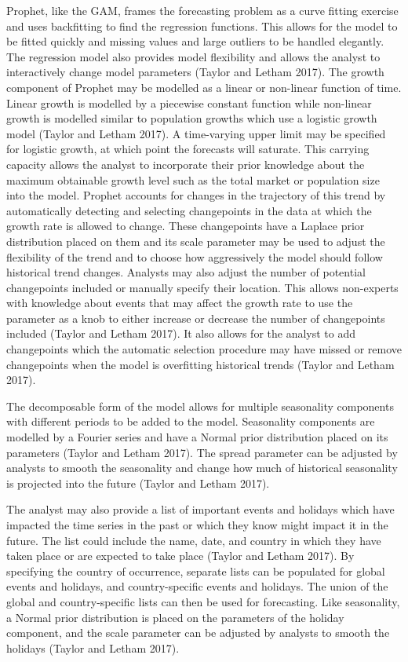 \documentclass[12pt,a4paper]{article}
\numberwithin{equation}{section}
\numberwithin{figure}{section}
\numberwithin{table}{section}
\begin{document}
Prophet, like the GAM, frames the forecasting problem as a curve fitting
exercise and uses backfitting to find the regression functions. This
allows for the model to be fitted quickly and missing values and large
outliers to be handled elegantly. The regression model also provides
model flexibility and allows the analyst to interactively change model
parameters (Taylor and Letham 2017). The growth component of Prophet may
be modelled as a linear or non-linear function of time. Linear growth is
modelled by a piecewise constant function while non-linear growth is
modelled similar to population growths which use a logistic growth model
(Taylor and Letham 2017). A time-varying upper limit may be specified
for logistic growth, at which point the forecasts will saturate. This
carrying capacity allows the analyst to incorporate their prior
knowledge about the maximum obtainable growth level such as the total
market or population size into the model. Prophet accounts for changes
in the trajectory of this trend by automatically detecting and selecting
changepoints in the data at which the growth rate is allowed to change.
These changepoints have a Laplace prior distribution placed on them and
its scale parameter may be used to adjust the flexibility of the trend
and to choose how aggressively the model should follow historical trend
changes. Analysts may also adjust the number of potential changepoints
included or manually specify their location. This allows non-experts
with knowledge about events that may affect the growth rate to use the
parameter as a knob to either increase or decrease the number of
changepoints included (Taylor and Letham 2017). It also allows for the
analyst to add changepoints which the automatic selection procedure may
have missed or remove changepoints when the model is overfitting
historical trends (Taylor and Letham 2017).

The decomposable form of the model allows for multiple seasonality
components with different periods to be added to the model. Seasonality
components are modelled by a Fourier series and have a Normal prior
distribution placed on its parameters (Taylor and Letham 2017). The
spread parameter can be adjusted by analysts to smooth the seasonality
and change how much of historical seasonality is projected into the
future (Taylor and Letham 2017).

The analyst may also provide a list of important events and holidays
which have impacted the time series in the past or which they know might
impact it in the future. The list could include the name, date, and
country in which they have taken place or are expected to take place
(Taylor and Letham 2017). By specifying the country of occurrence,
separate lists can be populated for global events and holidays, and
country-specific events and holidays. The union of the global and
country-specific lists can then be used for forecasting. Like
seasonality, a Normal prior distribution is placed on the parameters of
the holiday component, and the scale parameter can be adjusted by
analysts to smooth the holidays (Taylor and Letham 2017).
\end{document}
